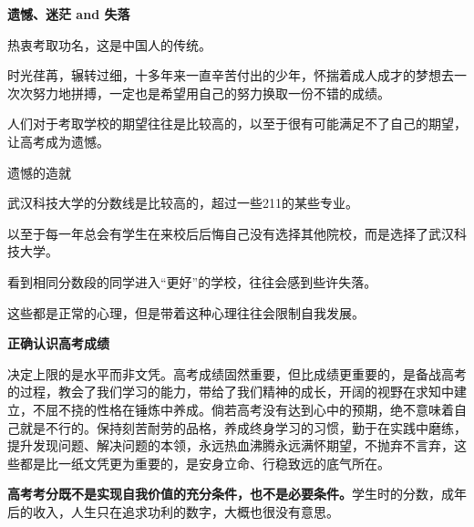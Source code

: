 \documentclass{beamer}	%
\theoremstyle{plain}
\theoremstyle{definition}
\theoremstyle{remark}
\numberwithin{equation}{section}
\begin{document}
\begin{frame}
	\begin{LARGE}
		\textbf{遗憾、迷茫 and 失落}
	\end{LARGE}
	
	\vspace{1cm}

	\begin{Large}
		热衷考取功名，这是中国人的传统。
	\end{Large}
	\vspace{0.75cm}

	时光荏苒，辗转过细，十多年来一直辛苦付出的少年，怀揣着成人成才的梦想去一次次努力地拼搏，一定也是希望用自己的努力换取一份不错的成绩。
	\vspace{0.5cm}

	人们对于考取学校的期望往往是比较高的，以至于很有可能满足不了自己的期望，让高考成为遗憾。

\end{frame}



\begin{frame}
	\begin{Large}
		遗憾的造就
	\end{Large}
	\vspace{0.75cm}

	武汉科技大学的分数线是比较高的，超过一些211的某些专业。
	\vspace{0.5cm}

	以至于每一年总会有学生在来校后后悔自己没有选择其他院校，而是选择了武汉科技大学。
	\vspace{0.5cm}

	看到相同分数段的同学进入“更好”的学校，往往会感到些许失落。
	\vspace{0.5cm}

	这些都是正常的心理，但是带着这种心理往往会限制自我发展。
\end{frame}

\begin{frame}
	\begin{LARGE}
		\textbf{正确认识高考成绩}
	\end{LARGE}
	\vspace{1cm}

	决定上限的是水平而非文凭。高考成绩固然重要，但比成绩更重要的，是备战高考的过程，教会了我们学习的能力，带给了我们精神的成长，开阔的视野在求知中建立，不屈不挠的性格在锤炼中养成。倘若高考没有达到心中的预期，绝不意味着自己就是不行的。保持刻苦耐劳的品格，养成终身学习的习惯，勤于在实践中磨练，提升发现问题、解决问题的本领，永远热血沸腾永远满怀期望，不抛弃不言弃，这些都是比一纸文凭更为重要的，是安身立命、行稳致远的底气所在。
	\vspace{0.5cm}

	\textbf{高考考分既不是实现自我价值的充分条件，也不是必要条件。}学生时的分数，成年后的收入，人生只在追求功利的数字，大概也很没有意思。
	

\end{frame}
\end{document}
